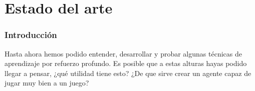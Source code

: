 \documentclass[11pt,fleqn]{book} %
\begin{document}
%
%
%
%
%
%


\part{Estado del arte}

\section*{Introducción}

Hasta ahora hemos podido entender, desarrollar y probar algunas técnicas de aprendizaje por refuerzo profundo. Es posible que a estas alturas hayas podido llegar a pensar, ¿qué utilidad tiene esto? ¿De que sirve crear un agente capaz de jugar muy bien a un juego? \\
\end{document}
